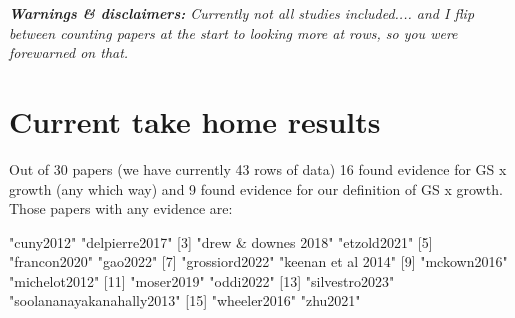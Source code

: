 \documentclass[11pt]{article}
\begin{document}
\renewcommand{\refname}{\CHead{}}

\iffalse
\title{Do growing season length and growth relate? \\ And if not, why not? \\ And if we're not sure, why is that?}
\author{Team Grephon}
\date{\today}
\maketitle
\fi 
\emph{{\bf Warnings \& disclaimers:}
Currently not all studies included.... and I flip between counting papers at the start to looking more at rows, so you were forewarned on that. }

\section{Current take home results}


Out of 30 papers (we have currently 43 rows of data) 16 found evidence for GS x growth (any which way) and  9 found evidence for our definition of GS x growth. Those papers with any evidence are:

\begin{Schunk}
\begin{Soutput}
 [1] "cuny2012"                 "delpierre2017"           
 [3] "drew & downes 2018"       "etzold2021"              
 [5] "francon2020"              "gao2022"                 
 [7] "grossiord2022"            "keenan et al 2014"       
 [9] "mckown2016"               "michelot2012"            
[11] "moser2019"                "oddi2022"                
[13] "silvestro2023"            "soolananayakanahally2013"
[15] "wheeler2016"              "zhu2021"                 
\end{Soutput}
\end{Schunk}
\end{document}
